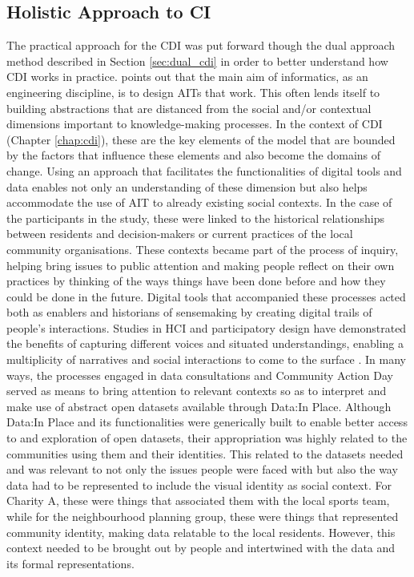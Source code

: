 \subsection{Holistic Approach to CI}
The practical approach for the CDI was put forward though the dual approach method described in Section \ref{sec:dual_cdi} in order to better understand how CDI works in practice. \citet{hakken_social_2003} points out that the main aim of informatics, as an engineering discipline, is to design AITs that work. This often lends itself to building abstractions that are distanced from the social and/or contextual dimensions important to knowledge-making processes. In the context of CDI (Chapter \ref{chap:cdi}), these are the key elements of the model that are bounded by the factors that influence these elements and also become the domains of change. Using an approach that facilitates the functionalities of digital tools and data enables not only an understanding of these dimension but also helps accommodate the use of AIT to already existing social contexts. In the case of the participants in the study, these were linked to the historical relationships between residents and decision-makers or current practices of the local community organisations. These contexts became part of the process of inquiry, helping bring issues to public attention and making people reflect on their own practices by thinking of the ways things have been done before and how they could be done in the future. Digital tools that accompanied these processes acted both as enablers and historians of sensemaking by creating digital trails of people's interactions. Studies in HCI and participatory design have demonstrated the benefits of capturing different voices and situated understandings, enabling a multiplicity of narratives and social interactions to come to the surface \citep{manuel_participatory_2017,rainey_gabber:_2019,bartindale_our_2019}. In many ways, the processes engaged in data consultations and Community Action Day served as means to bring attention to relevant contexts so as to interpret and make use of abstract open datasets available through Data:In Place. Although Data:In Place and its functionalities were generically built to enable better access to and exploration of open datasets, their appropriation was highly related to the communities using them and their identities. This related to the datasets needed and was relevant to not only the issues people were faced with but also the way data had to be represented to include the visual identity as social context. For Charity A, these were things that associated them with the local sports team, while for the neighbourhood planning group, these were things that represented community identity, making data relatable to the local residents. However, this context needed to be brought out by people and intertwined with the data and its formal representations.

